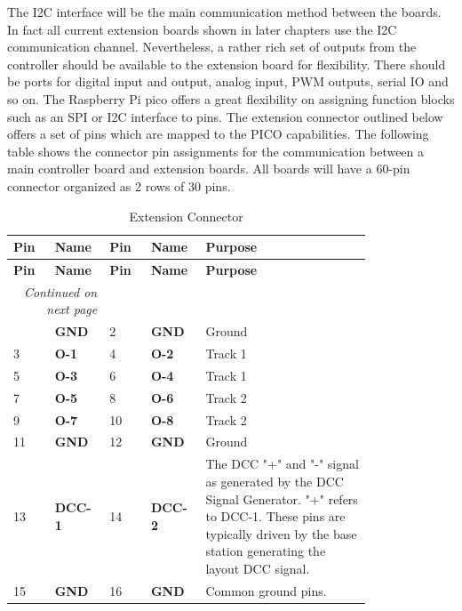 The I2C interface will be the main communication method between the boards. In fact all current extension boards shown in later chapters use the I2C communication channel. Nevertheless, a rather rich set of outputs from the controller should be available to the extension board for flexibility. There should be ports for digital input and output, analog input, PWM outputs, serial IO and so on. The Raspberry Pi pico offers a great flexibility on assigning function blocks such as an SPI or I2C interface to pins. The extension connector outlined below offers a set of pins which are mapped to the PICO capabilities. The following table shows the connector pin assignments for the communication between a main controller board and extension boards. All boards will have a 60-pin connector organized as 2 rows of 30 pins.

\begin{longtable}{@{}|p{0.1\linewidth}|p{0.1\linewidth}|p{0.1\linewidth}|p{0.1\linewidth}|p{0.4\linewidth}|@{}}
    \caption{Extension Connector} \\
    \toprule
    \textbf{Pin} & \textbf{Name} & \textbf{Pin} & \textbf{Name} & \textbf{Purpose} \\
    \midrule
    \endfirsthead
    \toprule
    \textbf{Pin} & \textbf{Name} & \textbf{Pin} & \textbf{Name} & \textbf{Purpose} \\
    \midrule
    \endhead
    \midrule
    \multicolumn{2}{r}{\textit{Continued on next page}} \\
    \midrule
    \endfoot
    \bottomrule
    \endlastfoot
    1 & \textbf{GND} & 2 & \textbf{GND} & Ground \\
    \midrule
    3 & \textbf{O-1} & 4 & \textbf{O-2} & Track 1 \\
    \midrule
    5 & \textbf{O-3} & 6 & \textbf{O-4} & Track 1 \\
    \midrule
    7 & \textbf{O-5} & 8 & \textbf{O-6} & Track 2 \\
    \midrule
    9 & \textbf{O-7} & 10 & \textbf{O-8} & Track 2 \\
    \midrule
    11 & \textbf{GND} & 12 & \textbf{GND} & Ground \\
    \midrule
    13 & \textbf{DCC-1} & 14 & \textbf{DCC-2} & The DCC "+" and "-" signal as generated by the DCC Signal Generator. "+" refers to DCC-1. These pins are typically driven by the base station generating the layout DCC signal.\\
    \midrule
    15 & \textbf{GND} & 16 & \textbf{GND} & Common ground pins. \\

\end{longtable}
